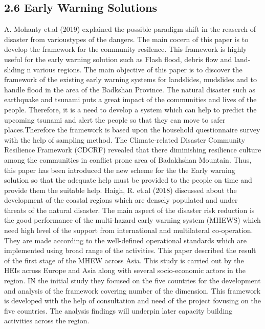\subsection{2.6 Early Warning Solutions}
A. Mohanty et.al (2019) explained the  possible paradigm shift in the reaserch of disaster from varioustypes of the dangers. The main cocern of this paper is to develop the framework for the community resilence. This framework is highly useful for the early warning solution such as Flash flood, debris flow and land-sliding n various regions. The main objective of this paper is to discover the framework of the existing early warning systems for landslides, mudslides and to handle flood in the area of the Badkshan Province. The natural disaster such as earthquake and tsunami puts a great impact of the communities and lives of the people. Therefore, it is a need to develop a system which can help to predict the upcoming tsunami and alert the people so that they can move to safer places.Therefore the framework is based upon the household questionnaire survey with the help of sampling method. The Climate-related Disaster Community Resilience Framework (CDCRF) revealed that there diminishing resilience culture among the communities in conflict prone area of Badakhshan Mountain. Thus, this paper has been introduced the new scheme for the the Early warning solution so that the adequate help must be provided to the people on time and provide them the suitable help.
Haigh, R. et.al (2018) discussed about the development of the coastal regions which are densely populated and under threats of the natural disaster. The main aspect of the disaster risk reduction is the good performance of the multi-hazard early warning system (MHEWS) which need high level of the support from international and multilateral co-operation. They are made according to the well-defined operational standards which are implemented using broad range of the activities. This paper described the result of the first stage of the MHEW across Asia. This study is carried out by the HEIs across Europe and Asia along with several socio-economic actors in the region.  IN the initial study they focused on the five countries  for the development and analysis of the framework covering number of the dimension. This framework is developed with the help of consultation and need of the project fovusing on the five countries. The analysis findings will underpin later capacity building activities across the region.




















